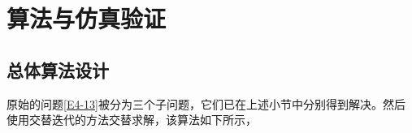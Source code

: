 \section{算法与仿真验证}\label{section4-5}

\subsection{总体算法设计}\label{section4-5-1}
原始的问题\eqref{E4-13}被分为三个子问题，它们已在上述小节中分别得到解决。然后使用交替迭代的方法交替求解，该算法如下所示，

